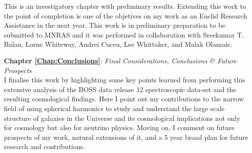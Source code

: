 \qquad This is an investigatory chapter with preliminary results. Extending this work to the point of completion is one of the objetives on my work as an Euclid Research Assistance in the next year. This work is in preliminary preparation to be submitted to MNRAS and it was performed in collaboration with Sreekumar T. Balan, Lorne Whiteway, Andrei Cuceu, Lee Whittaker, and Malak Olamaie.

\bigskip

\textbf{Chapter \ref{Chap:Conclusions}}: \textit{Final Considerations, Conclusions \& Future Prospects} \\[0.6em]
I finalise this work by highlighting some key points learned from performing this extensive analysis of the BOSS data release 12 spectroscopic data-set and the resulting cosmological findings. Here I point out my contributions to the narrow field of using spherical harmonics to study and understand the large scale structure of galaxies in the Universe and its cosmological implications not only for cosmology but also for neutrino physics. Moving on, I comment on future prospects of my work, natural extensions of it, and a 5 year broad plan for future research and contributions.

